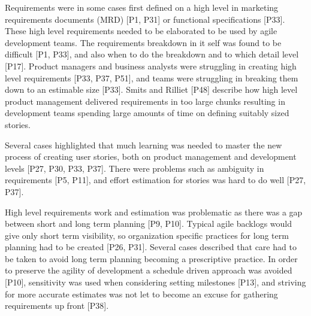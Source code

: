 Requirements were in some cases first defined on a high level in marketing
requirements documents (MRD) [P1, P31] or functional specifications [P33].
These high level requirements needed to be elaborated to be used by agile
development teams. The requirements breakdown in it self was found to be
difficult [P1, P33], and also when to do the breakdown and to which detail level
[P17].
Product managers and business analysts were struggling in creating high level
requirements [P33, P37, P51], and teams were struggling in breaking them down to an
estimable size [P33]. Smits and Rilliet [P48] describe how high level product
management delivered requirements in too large chunks resulting in development
teams spending large amounts of time on defining suitably sized stories.

Several cases highlighted that much learning was needed to master the new
process of creating user stories, both on product management and development
levels [P27, P30, P33, P37]. There were problems such as ambiguity in
requirements [P5, P11], and effort estimation for stories was hard to do well
[P27, P37].




High level requirements work and estimation was problematic as there was a gap
between short and long term planning [P9, P10]. Typical agile backlogs would
give only short term visibility, so organization specific practices for long
term planning had to be created [P26, P31]. Several cases described that care
had to be taken to avoid long term planning becoming a prescriptive practice. In
order to preserve the agility of development a schedule driven approach was
avoided [P10], sensitivity was used when considering setting milestones [P13],
and striving for more accurate estimates was not let to become an excuse for
gathering requirements up front [P38].



